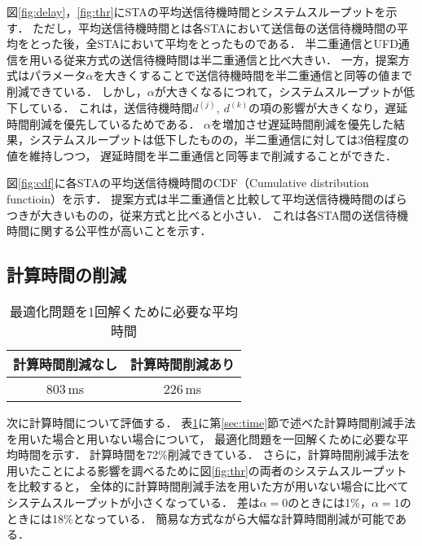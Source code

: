 \documentclass[technicalreport]{ieicej}
\begin{document}
		図\ref{fig:delay}，\ref{fig:thr}にSTAの平均送信待機時間とシステムスループットを示す．
		ただし，平均送信待機時間とは各STAにおいて送信毎の送信待機時間の平均をとった後，全STAにおいて平均をとったものである．
		半二重通信とUFD通信を用いる従来方式の送信待機時間は半二重通信と比べ大きい．
		一方，提案方式はパラメータ$\alpha$を大きくすることで送信待機時間を半二重通信と同等の値まで削減できている．
		しかし，$\alpha$が大きくなるにつれて，システムスループットが低下している．
		これは，送信待機時間$d^{(j)},\ d^{(k)}$の項の影響が大きくなり，遅延時間削減を優先しているためである．
		$\alpha$を増加させ遅延時間削減を優先した結果，システムスループットは低下したものの，半二重通信に対しては3倍程度の値を維持しつつ，
		遅延時間を半二重通信と同等まで削減することができた．
		\par
		図\ref{fig:cdf}に各STAの平均送信待機時間のCDF（Cumulative distribution functioin）を示す．
		提案方式は半二重通信と比較して平均送信待機時間のばらつきが大きいものの，従来方式と比べると小さい．
		これは各STA間の送信待機時間に関する公平性が高いことを示す．

	\subsection{計算時間の削減}
		\begin{table}[t]
			\centering
			\caption{最適化問題を1回解くために必要な平均時間}
			\label{tab:time}
			\begin{tabular}{cc}
			 計算時間削減なし & 計算時間削減あり\\ \hline
			 803\,ms & 226\,ms \\\hline
			\end{tabular}
		\end{table}

	次に計算時間について評価する．
	表\ref{tab:time}に第\ref{sec:time}節で述べた計算時間削減手法を用いた場合と用いない場合について，
	最適化問題を一回解くために必要な平均時間を示す．
	計算時間を72\%削減できている．
	さらに，計算時間削減手法を用いたことによる影響を調べるために図\ref{fig:thr}の両者のシステムスループットを比較すると，
	全体的に計算時間削減手法を用いた方が用いない場合に比べてシステムスループットが小さくなっている．
	差は$\alpha=0$のときには1\%，$\alpha=1$のときには18\%となっている．
	簡易な方式ながら大幅な計算時間削減が可能である．
\end{document}

